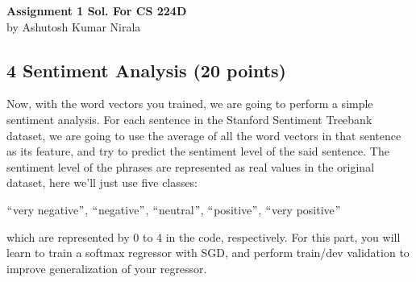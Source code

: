 \documentclass[11pt]{report}
\begin{document}
\begin{center}
\textbf{Assignment 1 Sol. For CS 224D}\\
by Ashutosh Kumar Nirala
\end{center}


\subsection*{4 Sentiment Analysis (20 points)}
Now, with the word vectors you trained, we are going to perform a simple sentiment analysis. For each
sentence in the Stanford Sentiment Treebank dataset, we are going to use the average of all the word vectors
in that sentence as its feature, and try to predict the sentiment level of the said sentence. The sentiment
level of the phrases are represented as real values in the original dataset, here we’ll just use five classes:\\

\centerline{$``$very negative$"$, $``$negative$"$, $``$neutral$"$, $``$positive$"$, $``$very positive$"$}


which are represented by 0 to 4 in the code, respectively. For this part, you will learn to train a softmax
regressor with SGD, and perform train/dev validation to improve generalization of your regressor.
\end{document}
